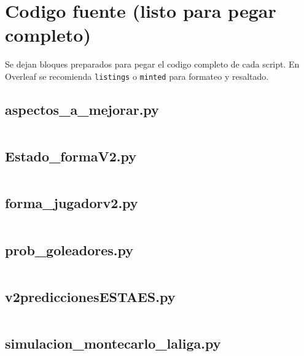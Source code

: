 \section{Codigo fuente (listo para pegar completo)}
Se dejan bloques preparados para pegar el codigo completo de cada script. En Overleaf se recomienda \texttt{listings} o \texttt{minted} para formateo y resaltado.

\subsection{aspectos\_a\_mejorar.py}
\begin{lstlisting}[language=Python]
% Pegar aqui el script completo: aspectos_a_mejorar.py
\end{lstlisting}

\subsection{Estado\_formaV2.py}
\begin{lstlisting}[language=Python]
% Pegar aqui el script completo: Estado_formaV2.py
\end{lstlisting}

\subsection{forma\_jugadorv2.py}
\begin{lstlisting}[language=Python]
% Pegar aqui el script completo: forma_jugadorv2.py
\end{lstlisting}

\subsection{prob\_goleadores.py}
\begin{lstlisting}[language=Python]
% Pegar aqui el script completo: prob_goleadores.py
\end{lstlisting}

\subsection{v2prediccionesESTAES.py}
\begin{lstlisting}[language=Python]
% Pegar aqui el script completo: v2prediccionesESTAES.py
\end{lstlisting}

\subsection{simulacion\_montecarlo\_laliga.py}
\begin{lstlisting}[language=Python]
% Pegar aqui el script completo: simulacion_montecarlo_laliga.py
\end{lstlisting}

